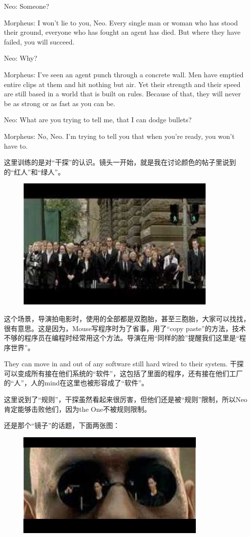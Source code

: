 \documentclass[UTF8]{ctexart}
\newenvironment{myquote}{\color{green} \setlength{\leftskip}{6em} \setlength{\rightskip}{4em} \setlength{\parindent}{-2em}}{\par}
\begin{document}
\begin{myquote}
Neo: Someone?

Morpheus: I won't lie to you, Neo. Every single man or woman who has stood their ground, everyone who has fought an agent has died. But where they have failed, you will succeed.

Neo: Why?

Morpheus: I've seen an agent punch through a concrete wall. Men have emptied entire clips at them and hit nothing but air. Yet their strength and their speed are still based in a world that is built on rules. Because of that, they will never be as strong or as fast as you can be.

Neo: What are you trying to tell me, that I can dodge bullets?

Morpheus: No, Neo. I'm trying to tell you that when you're ready, you won't have to.
\end{myquote}

这里训练的是对“干探”的认识。镜头一开始，就是我在讨论颜色的帖子里说到的“红人”和“绿人”。

\begin{figure}[htb]
\centering
\includegraphics[width=0.5\linewidth]{fig/read_Matrix-33-1}
\end{figure}

这个场景，导演拍电影时，使用的全部都是双胞胎，甚至三胞胎，大家可以找找，很有意思。这是因为，Mouse写程序时为了省事，用了“copy paste”的方法，技术不够的程序员在编程时经常用这个方法。导演在用“同样的脸”提醒我们这里是“程序世界”。

They can move in and out of any software still hard wired to their system. 干探可以变成所有接在他们系统的“软件”，这包括了里面的程序，还有接在他们工厂的“人”，人的mind在这里也被形容成了“软件”。

这里说到了“规则”，干探虽然看起来很厉害，但他们还是被“规则”限制，所以Neo肯定能够击败他们，因为the One不被规则限制。

还是那个“镜子”的话题，下面两张图：

\begin{figure}[htb]
\centering
\includegraphics[width=0.5\linewidth]{fig/read_Matrix-34}
\end{figure}
\end{document}
